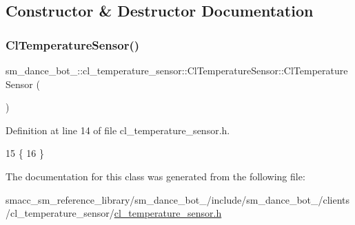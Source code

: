 \subsection{Constructor \& Destructor Documentation}
\mbox{\label{classsm__dance__bot__2_1_1cl__temperature__sensor_1_1ClTemperatureSensor_ac7c33050a8330c985eaf7a7539d9ea55}} 
\subsubsection{\texorpdfstring{Cl\+Temperature\+Sensor()}{ClTemperatureSensor()}}
{\footnotesize\ttfamily sm\+\_\+dance\+\_\+bot\+\_\+::cl\+\_\+temperature\+\_\+sensor\+::\+Cl\+Temperature\+Sensor\+::\+Cl\+Temperature\+Sensor (\begin{DoxyParamCaption}{ }\end{DoxyParamCaption})\hspace{0.3cm}{\ttfamily [inline]}}



Definition at line 14 of file cl\+\_\+temperature\+\_\+sensor.\+h.


\begin{DoxyCode}
15     \{
16     \}
\end{DoxyCode}


The documentation for this class was generated from the following file\+:\begin{DoxyCompactItemize}
\item 
smacc\+\_\+sm\+\_\+reference\+\_\+library/sm\+\_\+dance\+\_\+bot\+\_/include/sm\+\_\+dance\+\_\+bot\+\_/clients/cl\+\_\+temperature\+\_\+sensor/\hyperlink{sm__dance__bot__2_2include_2sm__dance__bot__2_2clients_2cl__temperature__sensor_2cl__temperature__sensor_8h}{cl\+\_\+temperature\+\_\+sensor.\+h}\end{DoxyCompactItemize}
